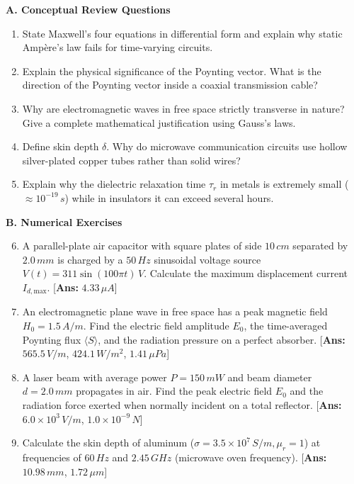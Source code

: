 \begin{practiceset}
\textbf{A. Conceptual Review Questions}
\begin{enumerate}
    \item State Maxwell's four equations in differential form and explain why static Ampère's law fails for time-varying circuits.
    \item Explain the physical significance of the Poynting vector. What is the direction of the Poynting vector inside a coaxial transmission cable?
    \item Why are electromagnetic waves in free space strictly transverse in nature? Give a complete mathematical justification using Gauss's laws.
    \item Define skin depth $\delta$. Why do microwave communication circuits use hollow silver-plated copper tubes rather than solid wires?
    \item Explain why the dielectric relaxation time $\tau_r$ in metals is extremely small ($\approx 10^{-19}\,\si{s}$) while in insulators it can exceed several hours.
\end{enumerate}

\textbf{B. Numerical Exercises}
\begin{enumerate}
    \setcounter{enumi}{5}
    \item A parallel-plate air capacitor with square plates of side $10\,\si{cm}$ separated by $2.0\,\si{mm}$ is charged by a $50\,\si{Hz}$ sinusoidal voltage source $V(t) = 311 \sin(100\pi t)\,\si{V}$. Calculate the maximum displacement current $I_{d,\text{max}}$. \hfill [\textbf{Ans:} $4.33\,\si{\mu A}$]
    \item An electromagnetic plane wave in free space has a peak magnetic field $H_0 = 1.5\,\si{A/m}$. Find the electric field amplitude $E_0$, the time-averaged Poynting flux $\langle S \rangle$, and the radiation pressure on a perfect absorber. \hfill [\textbf{Ans:} $565.5\,\si{V/m}$, $424.1\,\si{W/m^2}$, $1.41\,\si{\mu Pa}$]
    \item A laser beam with average power $P = 150\,\si{mW}$ and beam diameter $d = 2.0\,\si{mm}$ propagates in air. Find the peak electric field $E_0$ and the radiation force exerted when normally incident on a total reflector. \hfill [\textbf{Ans:} $6.0 \times 10^3\,\si{V/m}$, $1.0 \times 10^{-9}\,\si{N}$]
    \item Calculate the skin depth of aluminum ($\sigma = 3.5 \times 10^7\,\si{S/m}, \mu_r = 1$) at frequencies of $60\,\si{Hz}$ and $2.45\,\si{GHz}$ (microwave oven frequency). \hfill [\textbf{Ans:} $10.98\,\si{mm}$, $1.72\,\si{\mu m}$]
\end{enumerate}
\end{practiceset}

